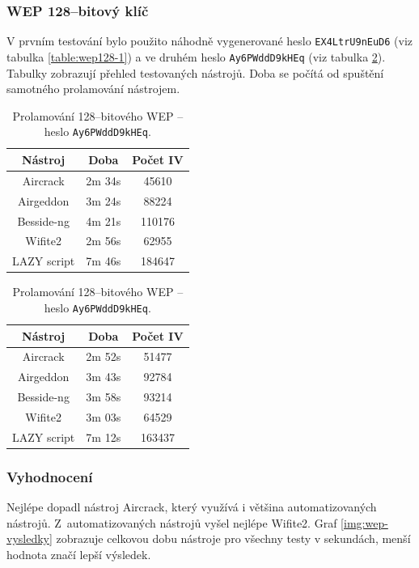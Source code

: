 \subsubsection*{WEP 128--bitový klíč}
V prvním testování bylo použito náhodně vygenerované heslo \texttt{EX4LtrU9nEuD6} (viz tabulka \ref{table:wep128-1}) a ve druhém heslo \texttt{Ay6PWddD9kHEq} (viz tabulka \ref{table:wep128-2}). Tabulky zobrazují přehled testovaných nástrojů. Doba se počítá od spuštění samotného prolamování nástrojem.

\begin{table}[htb]
\parbox{.45\linewidth}{
\centering
\begin{tabular}{|c|c|c|}
\hline
\textbf{Nástroj} & \textbf{Doba} & \textbf{Počet IV} \\ \hline
Aircrack         & 2m 34s                & 45610                   \\ \hline
Airgeddon        & 3m 24s                & 88224                   \\ \hline
Besside-ng       & 4m 21s                & 110176                  \\ \hline
Wifite2          & 2m 56s                & 62955                   \\ \hline
LAZY script      & 7m 46s                & 184647                  \\ \hline
\end{tabular}
\caption{Prolamování 128--bitového WEP -- heslo \texttt{EX4LtrU9nEuD6}.}
\label{table:wep128-1}
}
\hfill
\parbox{.45\linewidth}{
\centering
\begin{tabular}{|c|c|c|}
\hline
\textbf{Nástroj} & \textbf{Doba} & \textbf{Počet IV} \\ \hline
Aircrack         & 2m 52s                & 51477                   \\ \hline
Airgeddon        & 3m 43s                & 92784                   \\ \hline
Besside-ng       & 3m 58s                & 93214                  \\ \hline
Wifite2          & 3m 03s                & 64529                   \\ \hline
LAZY script      & 7m 12s                & 163437                  \\ \hline
\end{tabular}
\caption{Prolamování 128--bitového WEP -- heslo \texttt{Ay6PWddD9kHEq}.}
\label{table:wep128-2}
}
\end{table}

\subsubsection*{Vyhodnocení}
Nejlépe dopadl nástroj Aircrack, který využívá i většina automatizovaných nástrojů. Z~automatizovaných nástrojů vyšel nejlépe Wifite2. Graf \ref{img:wep-vysledky} zobrazuje celkovou dobu nástroje pro všechny testy v sekundách, menší hodnota značí lepší výsledek.

